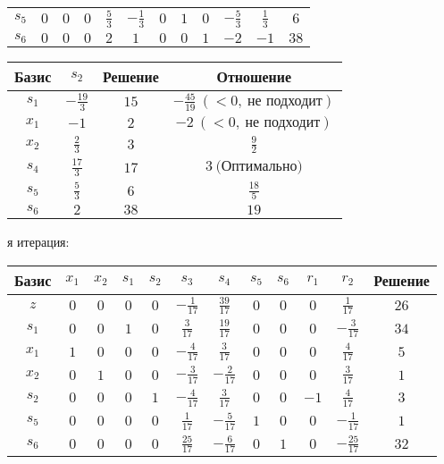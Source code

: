 \documentclass{article}%
\begin{document}
\begin{flushleft}
\begin{tabular}{|c|cccccccccc|c|}
$s_{5}$&$0$&$0$&$0$&$\frac{5}{3}$&$-\frac{1}{3}$&$0$&$1$&$0$&$-\frac{5}{3}$&$\frac{1}{3}$&$6$\\%
$s_{6}$&$0$&$0$&$0$&$2$&$1$&$0$&$0$&$1$&$-2$&$-1$&$38$\\%
\hline%
\end{tabular}%
\newline%
\newline%
\newline%
\begin{tabular}{|cccc|}%
\hline%
Базис&$s_{2}$&Решение&Отношение\\%
\hline%
$s_{1}$&$-\frac{19}{3}$&$15$&$-\frac{45}{19}\: (< 0, \: \text{не подходит})$\\%
$x_{1}$&$-1$&$2$&$-2\: (< 0, \: \text{не подходит})$\\%
$x_{2}$&$\frac{2}{3}$&$3$&$\frac{9}{2}$\\%
$s_{4}$&$\frac{17}{3}$&$17$&$3\: \text{(Оптимально)}$\\%
$s_{5}$&$\frac{5}{3}$&$6$&$\frac{18}{5}$\\%
$s_{6}$&$2$&$38$&$19$\\%
\hline%
\end{tabular}%
\newline%
\newline%
я итерация: %
\newline%
\newline%
\renewcommand{\arraystretch}{1.3}%
\begin{tabular}{|c|cccccccccc|c|}%
\hline%
Базис&$x_{1}$&$x_{2}$&$s_{1}$&$s_{2}$&$s_{3}$&$s_{4}$&$s_{5}$&$s_{6}$&$r_{1}$&$r_{2}$&Решение\\%
\hline%
$z$&$0$&$0$&$0$&$0$&$-\frac{1}{17}$&$\frac{39}{17}$&$0$&$0$&$0$&$\frac{1}{17}$&$26$\\%
\hline%
$s_{1}$&$0$&$0$&$1$&$0$&$\frac{3}{17}$&$\frac{19}{17}$&$0$&$0$&$0$&$-\frac{3}{17}$&$34$\\%
$x_{1}$&$1$&$0$&$0$&$0$&$-\frac{4}{17}$&$\frac{3}{17}$&$0$&$0$&$0$&$\frac{4}{17}$&$5$\\%
$x_{2}$&$0$&$1$&$0$&$0$&$-\frac{3}{17}$&$-\frac{2}{17}$&$0$&$0$&$0$&$\frac{3}{17}$&$1$\\%
$s_{2}$&$0$&$0$&$0$&$1$&$-\frac{4}{17}$&$\frac{3}{17}$&$0$&$0$&$-1$&$\frac{4}{17}$&$3$\\%
$s_{5}$&$0$&$0$&$0$&$0$&$\frac{1}{17}$&$-\frac{5}{17}$&$1$&$0$&$0$&$-\frac{1}{17}$&$1$\\%
$s_{6}$&$0$&$0$&$0$&$0$&$\frac{25}{17}$&$-\frac{6}{17}$&$0$&$1$&$0$&$-\frac{25}{17}$&$32$\\%

\end{tabular}
\end{flushleft}
\end{document}
